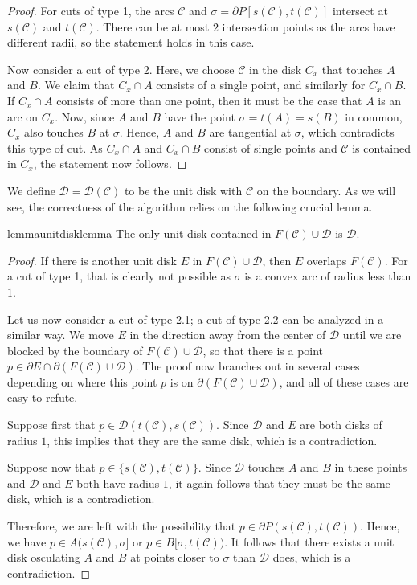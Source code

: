 \documentclass{article}
\newcommand{\PP}{P}
\newcommand{\se}{\sigma}
\newcommand{\cutreg}{F}
\newcommand{\cut}{\mathcal C}
\newcommand{\cutdisk}{\mathcal D}
\newcommand{\start}{s}
\newcommand{\terminal}{t}
\newcommand{\arcA}{A}
\newcommand{\arcB}{B}
\begin{document}
\begin{proof}
For cuts of type 1, the arcs $\cut$ and $\sigma=\partial\PP[\start(\cut),\terminal(\cut)]$ intersect at $\start(\cut)$ and $\terminal(\cut)$.
There can be at most $2$ intersection points as the arcs have different radii, so the statement holds in this case.

Now consider a cut of type 2.
Here, we choose $\cut$ in the disk $C_x$ that touches $\arcA$ and $\arcB$.
We claim that $C_x\cap \arcA$ consists of a single point, and similarly for $C_x\cap \arcB$.
If $C_x\cap \arcA$ consists of more than one point, then it must be the case that $\arcA$ is an arc on $C_x$.
Now, since $\arcA$ and $\arcB$ have the point $\se=\terminal(\arcA)=\start(\arcB)$ in common, $C_x$ also touches $\arcB$ at $\se$.
Hence, $\arcA$ and $\arcB$ are tangential at $\se$, which contradicts this type of cut.
As $C_x\cap \arcA$ and $C_x\cap \arcB$ consist of single points and $\cut$ is contained in $C_x$, the statement now follows.
\end{proof}

We define $\cutdisk=\cutdisk(\cut)$ to be the unit disk with $\cut$ on the boundary.
As we will see, the correctness of the algorithm relies on the following crucial lemma.


\begin{restatable}{lemma}{unitdisklemma}
\label{lem:unitpropSimple}
The only unit disk contained in $\cutreg(\cut)\cup \cutdisk$ is $\cutdisk$.
\end{restatable}

\begin{proof}
If there is another unit disk $E$ in $\cutreg(\cut)\cup \cutdisk$, then $E$ overlaps $F(\cut)$.
For a cut of type 1, that is clearly not possible as $\se$ is a convex arc of radius less than $1$.

Let us now consider a cut of type 2.1; a cut of type 2.2 can be analyzed in a similar way.
We move $E$ in the direction away from the center of $\cutdisk$ until we are blocked by the boundary of $\cutreg(\cut)\cup \cutdisk$, so that there is a point $p\in\partial E\cap\partial (\cutreg(\cut)\cup \cutdisk)$.
The proof now branches out in several cases depending on where this point $p$ is on $\partial (\cutreg(\cut)\cup \cutdisk)$, and all of these cases are easy to refute.
 
Suppose first that $p\in \cutdisk(\terminal(\cut),\start(\cut))$.
Since $\cutdisk$ and $E$ are both disks of radius $1$, this implies that they are the same disk, which is a contradiction.

Suppose now that $p\in\{\start(\cut),\terminal(\cut)\}$.
Since $\cutdisk$ touches $\arcA$ and $\arcB$ in these points and $\cutdisk$ and $E$ both have radius $1$, it again follows that they must be the same disk, which is a contradiction.

Therefore, we are left with the possibility that $p\in \partial \PP(\start(\cut),\terminal(\cut))$.
Hence, we have $p\in \arcA(\start(\cut),\se]$ or $p\in\arcB[\se,\terminal(\cut))$.
It follows that there exists a unit disk osculating $\arcA$ and $\arcB$ at points closer to $\se$ than $\cutdisk$ does, which is a contradiction.
\end{proof}
\end{document}
